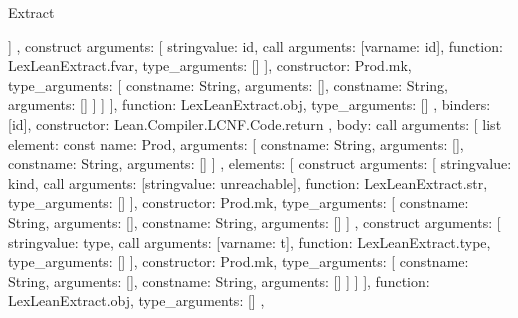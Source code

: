 \begin{lexlean}{Extract}
\begin{toolingmodule}
{{{{{{{                      ]
                    },
                    construct{
                      arguments: [
                        string{value: id},
                        call{
                          arguments: [var{name: id}],
                          function: LexLeanExtract.fvar,
                          type_arguments: []
                        }
                      ],
                      constructor: Prod.mk,
                      type_arguments: [
                        const{name: String, arguments: []},
                        const{name: String, arguments: []}
                      ]
                    }
                  ]
                }
              ],
              function: LexLeanExtract.obj,
              type_arguments: []
            },
            binders: [id],
            constructor: Lean.Compiler.LCNF.Code.return
          },
          {
            body: call{
              arguments: [
                list{
                  element: const{
                    name: Prod,
                    arguments: [
                      const{name: String, arguments: []},
                      const{name: String, arguments: []}
                    ]
                  },
                  elements: [
                    construct{
                      arguments: [
                        string{value: kind},
                        call{
                          arguments: [string{value: unreachable}],
                          function: LexLeanExtract.str,
                          type_arguments: []
                        }
                      ],
                      constructor: Prod.mk,
                      type_arguments: [
                        const{name: String, arguments: []},
                        const{name: String, arguments: []}
                      ]
                    },
                    construct{
                      arguments: [
                        string{value: type},
                        call{
                          arguments: [var{name: t}],
                          function: LexLeanExtract.type,
                          type_arguments: []
                        }
                      ],
                      constructor: Prod.mk,
                      type_arguments: [
                        const{name: String, arguments: []},
                        const{name: String, arguments: []}
                      ]
                    }
                  ]
                }
              ],
              function: LexLeanExtract.obj,
              type_arguments: []
            },
}}}}
\end{toolingmodule}
\end{lexlean}
